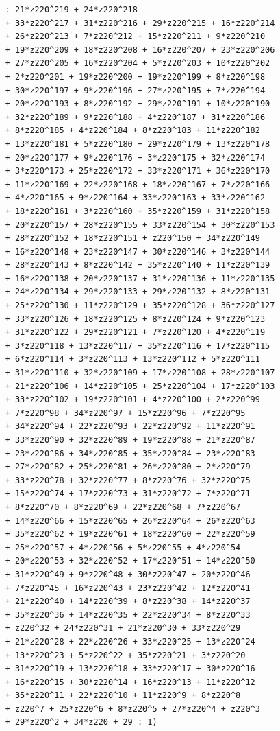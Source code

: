 \documentclass{scrartcl}
\theoremstyle{definition}
\begin{document}
\begin{lstlisting}
    : 21*z220^219 + 24*z220^218 
    + 33*z220^217 + 31*z220^216 + 29*z220^215 + 16*z220^214 
    + 26*z220^213 + 7*z220^212 + 15*z220^211 + 9*z220^210 
    + 19*z220^209 + 18*z220^208 + 16*z220^207 + 23*z220^206 
    + 27*z220^205 + 16*z220^204 + 5*z220^203 + 10*z220^202 
    + 2*z220^201 + 19*z220^200 + 19*z220^199 + 8*z220^198 
    + 30*z220^197 + 9*z220^196 + 27*z220^195 + 7*z220^194 
    + 20*z220^193 + 8*z220^192 + 29*z220^191 + 10*z220^190 
    + 32*z220^189 + 9*z220^188 + 4*z220^187 + 31*z220^186 
    + 8*z220^185 + 4*z220^184 + 8*z220^183 + 11*z220^182 
    + 13*z220^181 + 5*z220^180 + 29*z220^179 + 13*z220^178 
    + 20*z220^177 + 9*z220^176 + 3*z220^175 + 32*z220^174 
    + 3*z220^173 + 25*z220^172 + 33*z220^171 + 36*z220^170 
    + 11*z220^169 + 22*z220^168 + 18*z220^167 + 7*z220^166 
    + 4*z220^165 + 9*z220^164 + 33*z220^163 + 33*z220^162 
    + 18*z220^161 + 3*z220^160 + 35*z220^159 + 31*z220^158 
    + 20*z220^157 + 28*z220^155 + 33*z220^154 + 30*z220^153 
    + 28*z220^152 + 18*z220^151 + z220^150 + 34*z220^149 
    + 16*z220^148 + 23*z220^147 + 30*z220^146 + 3*z220^144 
    + 28*z220^143 + 8*z220^142 + 35*z220^140 + 11*z220^139 
    + 16*z220^138 + 20*z220^137 + 31*z220^136 + 11*z220^135 
    + 24*z220^134 + 29*z220^133 + 29*z220^132 + 8*z220^131 
    + 25*z220^130 + 11*z220^129 + 35*z220^128 + 36*z220^127 
    + 33*z220^126 + 18*z220^125 + 8*z220^124 + 9*z220^123 
    + 31*z220^122 + 29*z220^121 + 7*z220^120 + 4*z220^119 
    + 3*z220^118 + 13*z220^117 + 35*z220^116 + 17*z220^115 
    + 6*z220^114 + 3*z220^113 + 13*z220^112 + 5*z220^111 
    + 31*z220^110 + 32*z220^109 + 17*z220^108 + 28*z220^107 
    + 21*z220^106 + 14*z220^105 + 25*z220^104 + 17*z220^103 
    + 33*z220^102 + 19*z220^101 + 4*z220^100 + 2*z220^99 
    + 7*z220^98 + 34*z220^97 + 15*z220^96 + 7*z220^95 
    + 34*z220^94 + 22*z220^93 + 22*z220^92 + 11*z220^91 
    + 33*z220^90 + 32*z220^89 + 19*z220^88 + 21*z220^87 
    + 23*z220^86 + 34*z220^85 + 35*z220^84 + 23*z220^83 
    + 27*z220^82 + 25*z220^81 + 26*z220^80 + 2*z220^79 
    + 33*z220^78 + 32*z220^77 + 8*z220^76 + 32*z220^75 
    + 15*z220^74 + 17*z220^73 + 31*z220^72 + 7*z220^71 
    + 8*z220^70 + 8*z220^69 + 22*z220^68 + 7*z220^67 
    + 14*z220^66 + 15*z220^65 + 26*z220^64 + 26*z220^63 
    + 35*z220^62 + 19*z220^61 + 18*z220^60 + 22*z220^59 
    + 25*z220^57 + 4*z220^56 + 5*z220^55 + 4*z220^54 
    + 20*z220^53 + 32*z220^52 + 17*z220^51 + 14*z220^50 
    + 31*z220^49 + 9*z220^48 + 30*z220^47 + 20*z220^46 
    + 7*z220^45 + 16*z220^43 + 23*z220^42 + 12*z220^41 
    + 21*z220^40 + 14*z220^39 + 8*z220^38 + 14*z220^37 
    + 35*z220^36 + 14*z220^35 + 22*z220^34 + 8*z220^33 
    + z220^32 + 24*z220^31 + 21*z220^30 + 33*z220^29 
    + 21*z220^28 + 22*z220^26 + 33*z220^25 + 13*z220^24 
    + 13*z220^23 + 5*z220^22 + 35*z220^21 + 3*z220^20 
    + 31*z220^19 + 13*z220^18 + 33*z220^17 + 30*z220^16 
    + 16*z220^15 + 30*z220^14 + 16*z220^13 + 11*z220^12 
    + 35*z220^11 + 22*z220^10 + 11*z220^9 + 8*z220^8 
    + z220^7 + 25*z220^6 + 8*z220^5 + 27*z220^4 + z220^3 
    + 29*z220^2 + 34*z220 + 29 : 1)
\end{lstlisting}

\printbibliography
\end{document}
